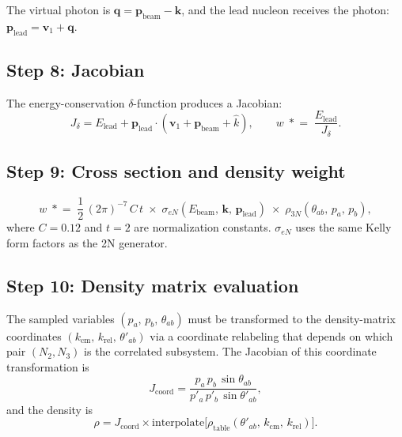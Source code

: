 \documentclass[11pt,a4paper]{article}
\newcommand{\vect}[1]{\bm{#1}}
\begin{document}
The virtual photon is $\vect{q} = \vect{p}_{\text{beam}} - \vect{k}$,
and the lead nucleon receives the photon:
$\vect{p}_{\text{lead}} = \vect{v}_{1} + \vect{q}$.

\subsection{Step 8: Jacobian}

The energy-conservation $\delta$-function produces a Jacobian:
\begin{equation}
  J_{\delta} = E_{\text{lead}} + \vect{p}_{\text{lead}} \cdot
               (\vect{v}_{1} + \vect{p}_{\text{beam}} + \hat{k}),
  \qquad
  w \;\mathrel{*}=\; \frac{E_{\text{lead}}}{J_{\delta}}.
\end{equation}

\subsection{Step 9: Cross section and density weight}

\begin{equation}
  w \;\mathrel{*}=\; \frac{1}{2}\,(2\pi)^{-7}\,C\,t
    \;\times\; \sigma_{eN}(E_{\text{beam}},\,\vect{k},\,\vect{p}_{\text{lead}})
    \;\times\; \rho_{3N}(\theta_{ab},\,p_{a},\,p_{b}),
\end{equation}
where $C = 0.12$ and $t = 2$ are normalization constants.
$\sigma_{eN}$ uses the same Kelly form factors as the 2N generator.

\subsection{Step 10: Density matrix evaluation}

The sampled variables $(p_{a},\,p_{b},\,\theta_{ab})$ must be
transformed to the density-matrix coordinates
$(k_{\text{cm}},\,k_{\text{rel}},\,\theta'_{ab})$ via a coordinate
relabeling that depends on which pair $(N_{2},N_{3})$ is the
correlated subsystem.  The Jacobian of this coordinate transformation is
\begin{equation}
  J_{\text{coord}}
  = \frac{p_{a}\,p_{b}\,\sin\theta_{ab}}
         {p'_{a}\,p'_{b}\,\sin\theta'_{ab}},
\end{equation}
and the density is
\begin{equation}
  \rho = J_{\text{coord}} \times
         \text{interpolate}\bigl[\rho_{\text{table}}(\theta'_{ab},\,k_{\text{cm}},\,k_{\text{rel}})\bigr].
\end{equation}
\end{document}
